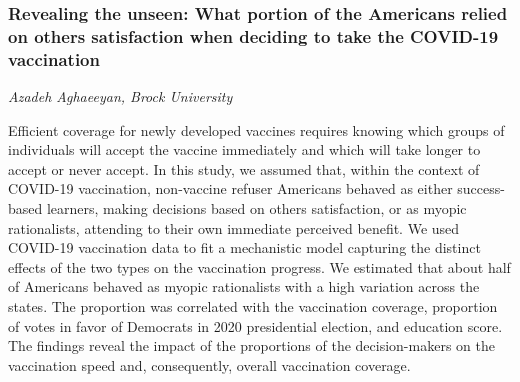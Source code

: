 \subsubsection*{Revealing the unseen: What portion of the Americans relied on others\textquotesingle{} satisfaction when deciding to take the COVID-19 vaccination}
\textit{Azadeh Aghaeeyan, Brock University}

Efficient coverage for newly developed vaccines requires knowing which
groups of individuals will accept the vaccine immediately and which will
take longer to accept or never accept. In this study, we assumed that, within the context of COVID-19
vaccination, non-vaccine refuser Americans behaved as either
success-based learners, making decisions based on
others\textquotesingle{} satisfaction, or as myopic rationalists,
attending to their own immediate perceived benefit. We used COVID-19 vaccination data to fit a mechanistic model capturing
the distinct effects of the two types on the vaccination progress. We estimated that about half of Americans behaved as myopic rationalists
with a high variation across the states. The proportion was correlated with the vaccination coverage, proportion
of votes in favor of Democrats in 2020 presidential election, and
education score. The findings reveal the impact of the proportions of the decision-makers
on the vaccination speed and, consequently, overall vaccination
coverage.
